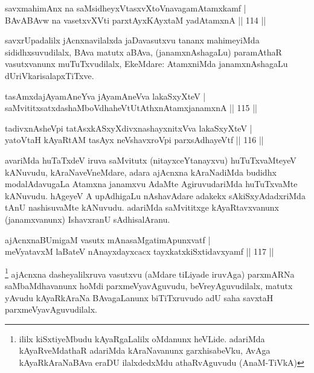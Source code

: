
\begin{shl}
savxmahimAnx na saMsidheyxVtasxvXtoV\s navagamAtamxkamf |\\
BAvABAvw na vasetxvXVti parxtAyxKAyxtaM yadAtamxnA \hfill || 114 ||
\end{shl}

\begin{artha}%
savxrUpadalilx jAcnxnavilalxda jaDavasutxvu tananx mahimeyiMda sididhxsuvudilalx, BAva matutx aBAva, (janamxnAshagaLu) paramAthaR vasutxvanunx muTuTxvudilalx, EkeMdare: AtamxniMda janamxnAshagaLu dUriVkarisalapxTiTxve.
\end{artha}


\begin{shl}
tasAmxdajAyamAneYva jAyamAneVva lakaSxyXteV |\\
saMvititxsatxdashaMboVdhaheVtUtAthxnAtamxjanamxnA \hfill || 115 ||
\end{shl}

\begin{shl}
tadivxnAsheV\s pi tatAsxkASxyXdivxnashayxnitxVva lakaSxyXteV |\\
yatoV\s taH kAyaRtAM tasAyx neVshavxroV\s pi parxsAdhayeVtf \hfill || 116 ||
\end{shl}

\begin{artha}
avariMda huTaTxdeV iruva saMvitutx (nitayxceYtanayxvu) huTuTxvaMteyeV kANuvudu, kAraNaveVneMdare, adara ajAcnxna kAraNadiMda budidhx modalAdavugaLa Atamxna janamxvu AdaMte AgiruvudariMda huTuTxvaMte kANuvudu. hAgeyeV A upAdhigaLu nAshavAdare adakekx sAkiSxyAdadxriMda tAnU nashisuvaMte kANuvudu. adariMda saMvititxge kAyaRtavxvanunx (janamxvanunx) IshavxranU sAdhisalAranu.
\end{artha}


\begin{shl}
ajAcnxnaBUmigaM vasutx mAnasaMgatimApunxvatf |\\
meVyatavxM laBateV nAnayxdayxcacx tayxkatxkiSxtidavxyamf \hfill || 117 ||
\end{shl}

\begin{artha}
\footnote{ililx kiSxtiyeMbudu kAyaRgaLalilx oMdanunx heVLide. adariMda kAyaRveMdathaR adariMda kAraNavanunx garxhisabeVku, AvAga kAyaRkAraNaBAva eraDU ilalxdedxMdu athaRvAguvudu (AnaM-TiVkA)}
ajAcnxna dasheyalilxruva vasutxvu (aMdare tiLiyade iruvAga) parxmARNa saMbaMdhavanunx hoMdi parxmeVyavAguvudu, beVreyAguvudilalx, matutx yAvudu kAyaRkAraNa BAvagaLanunx biTiTxruvudo adU saha savxtaH parxmeVyavAguvudilalx.
\end{artha}

